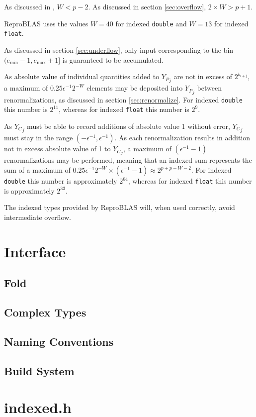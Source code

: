 \documentclass[12pt]{article}
\providecommand{\min}{\ensuremath{\text{min}}}
\providecommand{\max}{\ensuremath{\text{max}}}
\theoremstyle{plain}
\begin{document}
    As discussed in \cite{repsum}, $W < p - 2$. As discussed in section \ref{sec:overflow}, $2\times W > p + 1$.

    ReproBLAS uses the values $W = 40$ for indexed \verb|double| and $W = 13$ for indexed \verb|float|.

    As discussed in section \ref{sec:underflow}, only input corresponding to the bin $(e_{\min} - 1, e_{\max} + 1]$ is guaranteed to be accumulated.

    As absolute value of individual quantities added to ${Y_P}_j$ are not in excess of $2^{b_{i + j}}$, a maximum of $0.25\epsilon^{-1}2^{-W}$ elements may be deposited into ${Y_P}_j$ between renormalizations, as discussed in section \ref{sec:renormalize}. For indexed \verb|double| this number is $2^11$, whereas for indexed \verb|float| this number is $2^9$.

    As ${Y_C}_j$ must be able to record additions of absolute value 1 without error, ${Y_C}_j$ must stay in the range $(-\epsilon^{-1}, \epsilon^{-1})$. As each renormalization results in addition not in excess absolute value of 1 to ${Y_C}_j$, a maximum of $(\epsilon^{-1} - 1)$ renormalizations may be performed, meaning that an indexed sum represents the sum of a maximum of $0.25\epsilon^{-1}2^{-W} \times (\epsilon^{-1} - 1) \approx 2^{p + p - W - 2}$. For indexed \verb|double| this number is approximately $2^64$, whereas for indexed \verb|float| this number is approximately $2^33$.

    The indexed types provided by ReproBLAS will, when used correctly, avoid intermediate overflow.

\section{Interface}
  \subsection{Fold}
  \subsection{Complex Types}
  \subsection{Naming Conventions}
  \subsection{Build System}
\section{indexed.h}
\end{document}
